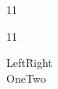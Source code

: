 \documentclass[paper=A4]{ropas-poster}
\begin{document}
\begin{postergrid}{1}{1}
\begin{posterblock}{1}{1}
\begin{tabbing}Left\=Right\\One\>Two\end{tabbing}
\end{posterblock}
\end{postergrid}
\end{document}
